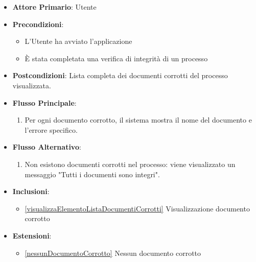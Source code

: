 \begin{itemize}
    \item \textbf{Attore Primario}: Utente
    \item \textbf{Precondizioni}: 
        \begin{itemize}
            \item L'Utente ha avviato l'applicazione
            \item È stata completata una verifica di integrità di un processo
        \end{itemize}    
    \item \textbf{Postcondizioni}: Lista completa dei documenti corrotti del processo visualizzata.     
    \item \textbf{Flusso Principale}:
        \begin{enumerate}
            \item Per ogni documento corrotto, il sistema mostra il nome del documento e l'errore specifico.
        \end{enumerate}
    \item \textbf{Flusso Alternativo}:\begin{enumerate}
        \item Non esistono documenti corrotti nel processo: viene visualizzato un messaggio "Tutti i documenti sono integri".
        \end{enumerate}
    \item \textbf{Inclusioni}: \begin{itemize}
        \item \ref{visualizzaElementoListaDocumentiCorrotti} Visualizzazione documento corrotto
        \end{itemize}
    \item \textbf{Estensioni}: \begin{itemize}
        \item \ref{nessunDocumentoCorrotto} Nessun documento corrotto
    \end{itemize}
\end{itemize}

